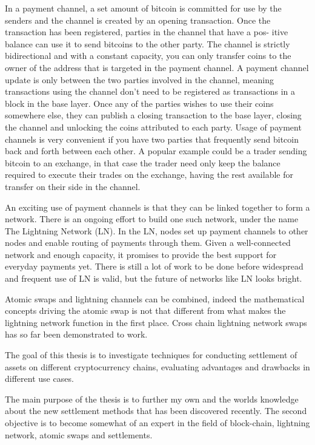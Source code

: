 In a payment channel, a set amount of bitcoin is committed for use by
the  senders  and  the  channel  is  created  by  an  opening  transaction.   Once
the transaction has been registered, parties in the channel that have a pos-
itive  balance  can  use  it  to  send  bitcoins  to  the  other  party.   The  channel is strictly bidirectional and with a constant capacity, you can only transfer coins to the owner of the address that is targeted in the payment channel. A payment channel update is only between the two parties involved in the
channel, meaning transactions using the channel don't need to be registered
as transactions in a block in the base layer.  Once any of the parties wishes
to  use  their  coins  somewhere  else,  they  can  publish  a  closing  transaction to the base layer, closing the channel and unlocking the coins attributed to each party.  Usage of payment channels is very convenient if you have two parties that frequently send bitcoin back and forth between each other. A popular example could be a trader sending bitcoin to an exchange, in that case the trader need only keep the balance required to execute their trades on the exchange, having the rest available for transfer on their side in the channel.

An exciting use of payment channels is that they can be linked together
to form a network.  There is an ongoing effort to build one such network,
under  the  name  The  Lightning  Network  (LN).  In  the  LN,  nodes  set  up
payment channels to other nodes and enable routing of payments through
them.  Given a well-connected network and enough capacity, it promises to
provide the best support for everyday payments yet.  There is still a lot of
work to be done before widespread and frequent use of LN is valid, but the
future of networks like LN looks bright.

Atomic swaps and lightning channels can be combined, indeed the mathematical concepts driving the atomic swap is not that different from what makes the lightning network function in the first place. Cross chain lightning network swaps has so far been demonstrated to work. 

The  goal  of  this  thesis  is  to  investigate  techniques  for  conducting  settlement of assets on different cryptocurrency chains, evaluating advantages
and drawbacks in different use cases.  

The main purpose of the thesis is to further my own and the worlds knowledge about the new settlement methods that has been discovered recently. The second objective is to become somewhat of an expert in the field of block-chain, lightning network, atomic swaps and settlements. 
